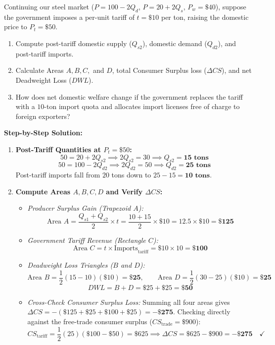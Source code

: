 \documentclass[11pt,letterpaper]{article}
\begin{document}
\begin{tcolorbox}[colback=LightSlate,colframe=CourseBlue,title=\textbf{Work It Out 14.2: Welfare Impact of a \$10 Steel Tariff vs. a 10-Ton Quota}]
Continuing our steel market ($P = 100 - 2Q_d$, $P = 20 + 2Q_s$, $P_w = \$40$), suppose the government imposes a per-unit tariff of $t = \$10$ per ton, raising the domestic price to $P_t = \$50$.
\begin{enumerate}
    \item Compute post-tariff domestic supply ($Q_{s2}$), domestic demand ($Q_{d2}$), and post-tariff imports.
    \item Calculate Areas $A, B, C,$ and $D$, total Consumer Surplus loss ($\Delta CS$), and net Deadweight Loss ($DWL$).
    \item How does net domestic welfare change if the government replaces the tariff with a $10$-ton import quota and allocates import licenses free of charge to foreign exporters?
\end{enumerate}

\medskip
\noindent\textbf{Step-by-Step Solution:}
\begin{enumerate}
    \item \textbf{Post-Tariff Quantities at $P_t = \$50$:}
    \[
    50 = 20 + 2Q_{s2} \implies 2Q_{s2} = 30 \implies Q_{s2} = \mathbf{15\text{ tons}}
    \]
    \[
    50 = 100 - 2Q_{d2} \implies 2Q_{d2} = 50 \implies Q_{d2} = \mathbf{25\text{ tons}}
    \]
    Post-tariff imports fall from $20$ tons down to $25 - 15 = \mathbf{10\text{ tons}}$.

    \item \textbf{Compute Areas $A, B, C, D$ and Verify $\Delta CS$:}
    \begin{itemize}
        \item \emph{Producer Surplus Gain (Trapezoid $A$):}
        \[
        \text{Area } A = \frac{Q_{s1} + Q_{s2}}{2} \times t = \frac{10 + 15}{2} \times \$10 = 12.5 \times \$10 = \mathbf{\$125}
        \]
        \item \emph{Government Tariff Revenue (Rectangle $C$):}
        \[
        \text{Area } C = t \times \text{Imports}_{\text{tariff}} = \$10 \times 10 = \mathbf{\$100}
        \]
        \item \emph{Deadweight Loss Triangles ($B$ and $D$):}
        \[
        \text{Area } B = \frac{1}{2}(15 - 10)(\$10) = \mathbf{\$25}, \qquad \text{Area } D = \frac{1}{2}(30 - 25)(\$10) = \mathbf{\$25}
        \]
        \[
        DWL = B + D = \$25 + \$25 = \mathbf{\$50}
        \]
        \item \emph{Cross-Check Consumer Surplus Loss:}
        Summing all four areas gives $\Delta CS = -(\$125 + \$25 + \$100 + \$25) = \mathbf{-\$275}$. Checking directly against the free-trade consumer surplus ($CS_{\text{trade}} = \$900$):
        \[
        CS_{\text{tariff}} = \frac{1}{2}(25)(\$100 - \$50) = \$625 \implies \Delta CS = \$625 - \$900 = \mathbf{-\$275} \quad \checkmark
        \]
    \end{itemize}


\end{enumerate}
\end{tcolorbox}
\end{document}
